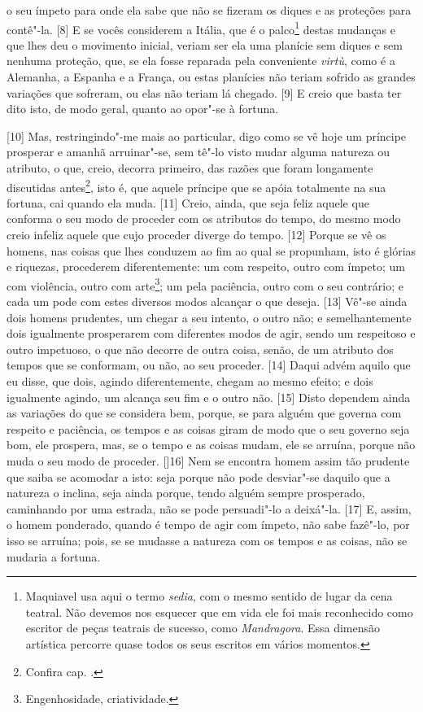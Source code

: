 o seu ímpeto para onde ela sabe que não se fizeram os diques e as
proteções para contê"-la. {[}8{]} E se vocês considerem a Itália, que é o
palco\footnote{Maquiavel usa aqui o termo \emph{sedia}, com o mesmo
  sentido de lugar da cena teatral. Não devemos nos esquecer que em vida
  ele foi mais reconhecido como escritor de peças teatrais de sucesso,
  como \emph{Mandragora}. Essa dimensão artística percorre quase todos
  os seus escritos em vários momentos.} destas mudanças e que lhes deu o
movimento inicial, veriam ser ela uma planície sem diques e sem nenhuma
proteção, que, se ela fosse reparada pela conveniente \emph{virtù}, como
é a Alemanha, a Espanha e a França, ou estas planícies não teriam
sofrido as grandes variações que sofreram, ou elas não teriam lá
chegado. {[}9{]} E creio que basta ter dito isto, de modo geral, quanto
ao opor"-se à fortuna.

{[}10{]} Mas, restringindo"-me mais ao particular, digo como se vê hoje
um príncipe prosperar e amanhã arruinar"-se, sem tê"-lo visto mudar alguma
natureza ou atributo, o que, creio, decorra primeiro, das razões que
foram longamente discutidas antes\footnote{Confira cap. .}, isto é,
que aquele príncipe que se apóia totalmente na sua fortuna, cai quando
ela muda. {[}11{]} Creio, ainda, que seja feliz aquele que conforma o
seu modo de proceder com os atributos do tempo, do mesmo modo creio
infeliz aquele que cujo proceder diverge do tempo. {[}12{]} Porque se vê
os homens, nas coisas que lhes conduzem ao fim ao qual se propunham,
isto é glórias e riquezas, procederem diferentemente: um com respeito,
outro com ímpeto; um com violência, outro com arte\footnote{Engenhosidade,
  criatividade.}; um pela paciência, outro com o seu contrário; e cada
um pode com estes diversos modos alcançar o que deseja. {[}13{]} Vê"-se
ainda dois homens prudentes, um chegar a seu intento, o outro não; e
semelhantemente dois igualmente prosperarem com diferentes modos de
agir, sendo um respeitoso e outro impetuoso, o que não decorre de outra
coisa, senão, de um atributo dos tempos que se conformam, ou não, ao seu
proceder. {[}14{]} Daqui advém aquilo que eu disse, que dois, agindo
diferentemente, chegam ao mesmo efeito; e dois igualmente agindo, um
alcança seu fim e o outro não. {[}15{]} Disto dependem ainda as
variações do que se considera bem, porque, se para alguém que governa
com respeito e paciência, os tempos e as coisas giram de modo que o seu
governo seja bom, ele prospera, mas, se o tempo e as coisas mudam, ele
se arruína, porque não muda o seu modo de proceder. {[]}16{]} Nem se encontra homem assim tão prudente que saiba se acomodar a isto: seja porque não pode desviar"-se daquilo que a natureza o inclina, seja ainda porque, tendo alguém sempre prosperado, caminhando por uma estrada, não se pode persuadi"-lo a deixá"-la. {[}17{]} E, assim, o homem ponderado, quando é tempo de agir com ímpeto, não sabe fazê"-lo, por isso se arruína; pois, se se mudasse a natureza com os tempos e as coisas, não se mudaria a fortuna.

